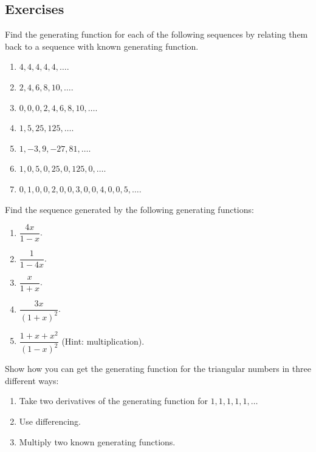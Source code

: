 \documentclass[10pt,]{book}
\theoremstyle{plain}
\theoremstyle{definition}
\theoremstyle{definition}
\theoremstyle{definition}
\theoremstyle{definition}
\numberwithin{equation}{chapter}
\begin{document}
\subsection*{Exercises}\label{exercises-8}
\begin{divisionexercise}{1}\hypertarget{exercise-84}{}
\hypertarget{p-1117}{}%
Find the generating function for each of the following sequences by relating them back to a sequence with known generating function.%
\par
\hypertarget{p-1118}{}%
\leavevmode%
\begin{enumerate}[label=(\alph*)]
\item\hypertarget{li-160}{}\(4,4,4,4,4,\ldots\).%
\item\hypertarget{li-161}{}\(2, 4, 6, 8, 10, \ldots\).%
\item\hypertarget{li-162}{}\(0,0,0,2,4,6,8,10,\ldots\).%
\item\hypertarget{li-163}{}\(1, 5, 25, 125, \ldots\).%
\item\hypertarget{li-164}{}\(1, -3, 9, -27, 81, \ldots\).%
\item\hypertarget{li-165}{}\(1, 0, 5, 0, 25, 0, 125, 0, \ldots\).%
\item\hypertarget{li-166}{}\(0, 1, 0, 0, 2, 0, 0, 3, 0, 0, 4, 0, 0, 5, \ldots\).%
\end{enumerate}
%
\end{divisionexercise}%
\begin{divisionexercise}{2}\hypertarget{exercise-85}{}
\hypertarget{p-1120}{}%
Find the sequence generated by the following generating functions:%
\par
\hypertarget{p-1121}{}%
\leavevmode%
\begin{enumerate}[label=(\alph*)]
\item\hypertarget{li-174}{}\(\dfrac{4x}{1-x}\).%
\item\hypertarget{li-175}{}\(\dfrac{1}{1-4x}\).%
\item\hypertarget{li-176}{}\(\dfrac{x}{1+x}\).%
\item\hypertarget{li-177}{}\(\dfrac{3x}{(1+x)^2}\).%
\item\hypertarget{li-178}{}\(\dfrac{1+x+x^2}{(1-x)^2}\) (Hint: multiplication).%
\end{enumerate}
%
\end{divisionexercise}%
\begin{divisionexercise}{3}\hypertarget{exercise-86}{}
\hypertarget{p-1123}{}%
Show how you can get the generating function for the triangular numbers in three different ways:%
\par
\hypertarget{p-1124}{}%
\leavevmode%
\begin{enumerate}[label=(\alph*)]
\item\hypertarget{li-184}{}\hypertarget{p-1125}{}%
Take two derivatives of the generating function for \(1,1,1,1,1, \ldots\)%
\item\hypertarget{li-185}{}\hypertarget{p-1126}{}%
Use differencing.%
\item\hypertarget{li-186}{}\hypertarget{p-1127}{}%
Multiply two known generating functions.%
\end{enumerate}
%
\end{divisionexercise}%
\end{document}
